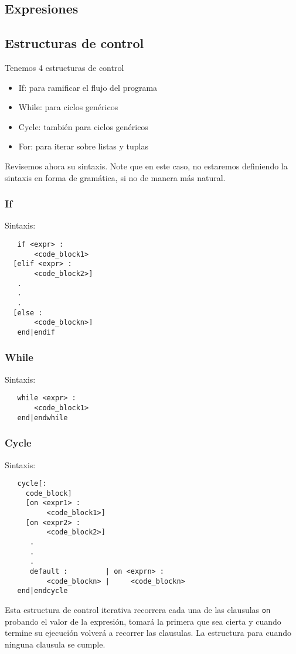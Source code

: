 \documentclass[12pt, spanish]{report}
\begin{document}
\subsection{Expresiones}
\label{sec:expr}

\subsection{Estructuras de control}
\label{sec:ecntrl}
Tenemos 4 estructuras de control
\begin{itemize}
\item If: para ramificar el flujo del programa
\item While: para ciclos gen\'ericos
\item Cycle: tambi\'en para ciclos gen\'ericos
\item For: para iterar sobre listas y tuplas
\end{itemize}

Revisemos ahora su sintaxis. Note que en este caso, no estaremos
definiendo la sintaxis en forma de gram\'atica, si no de manera m\'as natural.

\subsubsection{If}
Sintaxis:
\begin{verbatim}
   if <expr> :
       <code_block1>
  [elif <expr> :
       <code_block2>]
   .
   .
   .
  [else :
       <code_blockn>]
   end|endif
\end{verbatim}

\subsubsection{While}
Sintaxis:
\begin{verbatim}
   while <expr> :
       <code_block1>
   end|endwhile
\end{verbatim}

\subsubsection{Cycle}
Sintaxis:
\begin{verbatim}
   cycle[:
     code_block]
     [on <expr1> :
          <code_block1>]
     [on <expr2> :
          <code_block2>]
      .
      .
      .
      default :         | on <exprn> :
          <code_blockn> |     <code_blockn>
   end|endcycle
\end{verbatim}
Esta estructura de control iterativa recorrera cada una de las clausulas
\texttt{on} probando el valor de la expresi\'on, tomar\'a la primera que sea cierta
y cuando termine su ejecuci\'on volver\'a a recorrer las clausulas. La
estructura para cuando ninguna clausula se cumple.
\end{document}
